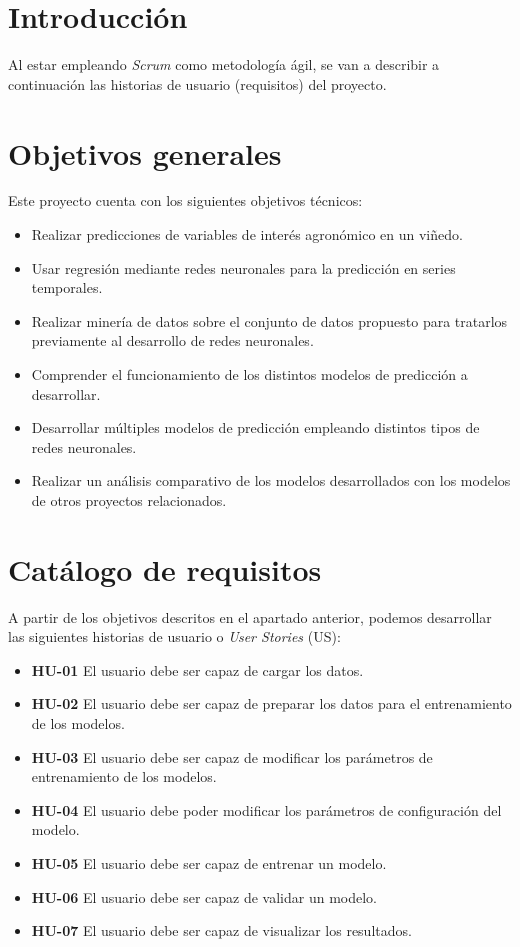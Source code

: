 
\section{Introducción}

Al estar empleando \textit{Scrum} como metodología ágil, se van a describir a continuación las historias de usuario (requisitos) del proyecto.

\section{Objetivos generales}

Este proyecto cuenta con los siguientes objetivos técnicos:

\begin{itemize}
    \item Realizar predicciones de variables de interés agronómico en un viñedo.
    \item Usar regresión mediante redes neuronales para la predicción en series temporales.
    \item Realizar minería de datos sobre el conjunto de datos propuesto para tratarlos previamente al desarrollo de redes neuronales.
    \item Comprender el funcionamiento de los distintos modelos de predicción a desarrollar.
    \item Desarrollar múltiples modelos de predicción empleando distintos tipos de redes neuronales.
    \item Realizar un análisis comparativo de los modelos desarrollados con los modelos de otros proyectos relacionados.
\end{itemize}

\section{Catálogo de requisitos}

A partir de los objetivos descritos en el apartado anterior, podemos desarrollar las siguientes historias de usuario o \textit{User Stories} (US):

\begin{itemize}
    \item \textbf{HU-01} El usuario debe ser capaz de cargar los datos.
    \item \textbf{HU-02} El usuario debe ser capaz de preparar los datos para el entrenamiento de los modelos.
    \item \textbf{HU-03} El usuario debe ser capaz de modificar los parámetros de entrenamiento de los modelos.
    \item \textbf{HU-04} El usuario debe poder modificar los parámetros de configuración del modelo.
    \item \textbf{HU-05} El usuario debe ser capaz de entrenar un modelo.
    \item \textbf{HU-06} El usuario debe ser capaz de validar un modelo.
    \item \textbf{HU-07} El usuario debe ser capaz de visualizar los resultados.
\end{itemize}

